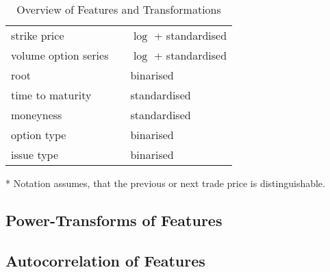 \begin{table}[H]
\begin{threeparttable}
\begin{tabular}{@{}lll@{}}
            strike price            &                                                                                                  & $\log$ + standardised           \\
            volume option series    &                                                                                                  & $\log$ + standardised           \\
            root                    &                                                                                                  & binarised          \\
            time to maturity        &                                                                                                  &  standardised         \\
            moneyness               &                                                                                                  &  standardised         \\
            option type             &                                                                                                  &  binarised         \\
            issue type              &                                                                                                  &  binarised         \\ \bottomrule
        \end{tabular}
        \begin{tablenotes}\footnotesize
            \item[*] Notation assumes, that the previous or next trade price is distinguishable.
        \end{tablenotes}
    \end{threeparttable}
    \caption[Overview of Features and Transformations]{Overview of Features and Transformations}
    \label{tab:features-transformations}
\end{table}

\newpage

\newpage
\subsection{Power-Transforms of Features}
\label{app:power-transforms-of-features}

\newpage
\subsection{Autocorrelation of Features}
\label{app:autocorrelation-of-features}

